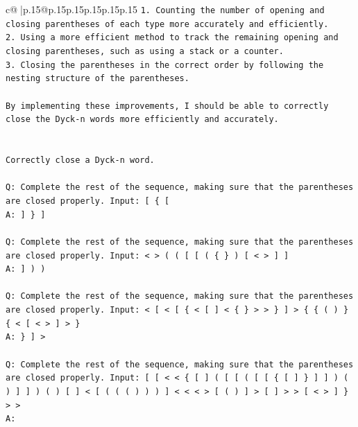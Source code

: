 \documentclass{article}
\begin{document}
{\begin{supertabular}{c@{$\;$}|p{.15\linewidth}@{}p{.15\linewidth}p{.15\linewidth}p{.15\linewidth}p{.15\linewidth}p{.15\linewidth}}
{{{\texttt{1. Counting the number of opening and closing parentheses of each type more accurately and efficiently.} \\
\texttt{2. Using a more efficient method to track the remaining opening and closing parentheses, such as using a stack or a counter.} \\
\texttt{3. Closing the parentheses in the correct order by following the nesting structure of the parentheses.} \\
\\ 
\texttt{By implementing these improvements, I should be able to correctly close the Dyck{-}n words more efficiently and accurately.} \\
\\ 
\\ 
\texttt{Correctly close a Dyck{-}n word.} \\
\\ 
\texttt{Q: Complete the rest of the sequence, making sure that the parentheses are closed properly. Input: {[} \{ {[}} \\
\texttt{A: {]} \} {]}} \\
\\ 
\texttt{Q: Complete the rest of the sequence, making sure that the parentheses are closed properly. Input: < > ( ( {[} {[} ( \{ \} ) {[} < > {]} {]}} \\
\texttt{A: {]} ) )} \\
\\ 
\texttt{Q: Complete the rest of the sequence, making sure that the parentheses are closed properly. Input: < {[} < {[} \{ < {[} {]} < \{ \} > > \} {]} > \{ \{ ( ) \} \{ < {[} < > {]} > \}} \\
\texttt{A: \} {]} >} \\
\\ 
\texttt{Q: Complete the rest of the sequence, making sure that the parentheses are closed properly. Input: {[} {[} < < \{ {[} {]} ( {[} {[} ( {[} {[} \{ {[} {]} \} {]} {]} ) ( ) {]} {]} ) ( ) {[} {]} < {[} ( ( ( ) ) ) {]} < < < > {[} ( ) {]} > {[} {]} > > {[} < > {]} \} > >} \\
\texttt{A:} \\
            }
        }
    }
     \\ \\


\end{supertabular}}
\end{document}
